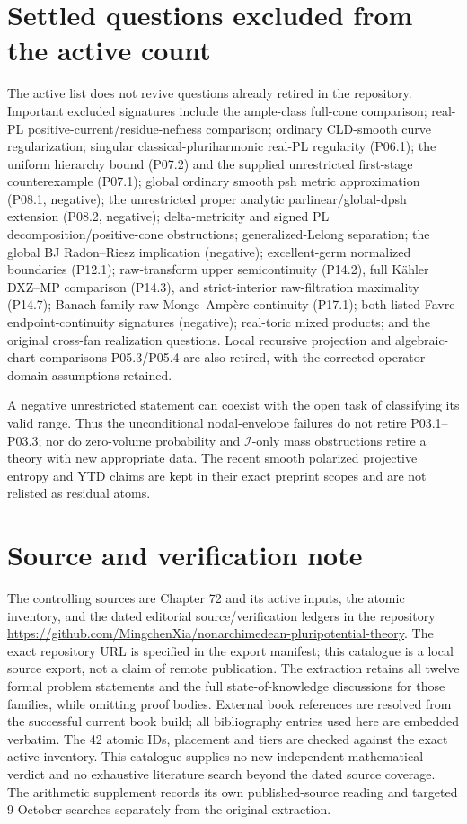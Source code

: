 \documentclass[11pt,a4paper]{article}
\theoremstyle{definition}
\theoremstyle{remark}
\begin{document}
\section*{Settled questions excluded from the active count}
The active list does not revive questions already retired in the repository.
Important excluded signatures include the ample-class full-cone comparison;
real-PL positive-current/residue-nefness comparison; ordinary CLD-smooth
curve regularization; singular classical-pluriharmonic real-PL regularity
(P06.1); the uniform hierarchy bound (P07.2) and the supplied unrestricted
first-stage counterexample (P07.1); global ordinary smooth psh metric
approximation (P08.1, negative); the unrestricted proper analytic
parlinear/global-dpsh extension (P08.2, negative); delta-metricity and signed
PL decomposition/positive-cone obstructions; generalized-Lelong separation;
the global BJ Radon--Riesz implication (negative); excellent-germ normalized
boundaries (P12.1); raw-transform upper semicontinuity (P14.2), full
K\"ahler DXZ--MP comparison (P14.3), and strict-interior raw-filtration
maximality (P14.7); Banach-family raw Monge--Ampère continuity (P17.1);
both listed Favre endpoint-continuity signatures (negative); real-toric
mixed products; and the original cross-fan realization questions.
Local recursive projection and algebraic-chart comparisons P05.3/P05.4
are also retired, with the corrected operator-domain assumptions retained.

A negative unrestricted statement can coexist with the open task of
classifying its valid range. Thus the unconditional nodal-envelope failures
do not retire P03.1--P03.3; nor do zero-volume probability and
\(\mathcal I\)-only mass obstructions retire a theory with new appropriate
data. The recent smooth polarized projective entropy and YTD claims are
kept in their exact preprint scopes and are not relisted as residual atoms.

\section*{Source and verification note}
The controlling sources are Chapter 72 and its active inputs, the atomic
inventory, and the dated editorial source/verification ledgers in the
repository \url{https://github.com/MingchenXia/nonarchimedean-pluripotential-theory}.
The exact repository URL is specified in the export manifest; this catalogue
is a local source export, not a claim of remote publication.
The extraction retains all twelve formal problem statements and the full
state-of-knowledge discussions for those families, while omitting proof
bodies. External book references are resolved from the successful current
book build; all bibliography entries used here are embedded verbatim.
The 42 atomic IDs, placement and tiers are checked against the exact active
inventory. This catalogue supplies no new independent mathematical verdict
and no exhaustive literature search beyond the dated source coverage.
The arithmetic supplement records its own published-source reading and
targeted 9 October searches separately from the original extraction.
\end{document}
